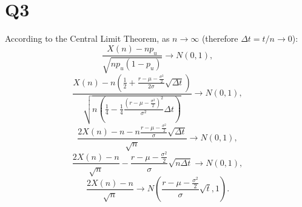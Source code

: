 \documentclass[final,3p,times]{elsarticle}
\begin{document}
\section{Q3}
	According to the Central Limit Theorem, as $n \to \infty$ (therefore $\Delta t= t/n \to 0$):
	\begin{equation}
		\frac{X(n)-n p_u}{\sqrt{n p_u \left(1- p_u\right)}} \to N\left(0,1\right)
		,
	\end{equation}
	\begin{equation*}
		\frac{X(n)-n \left(\frac{1}{2} + \frac{r-\mu-\frac{\sigma^2}{2}}{2\sigma} \sqrt{\Delta t}\right)}{\sqrt{n \left( \frac{1}{4} - \frac{1}{4}\frac{\left(r-\mu-\frac{\sigma^2}{2}\right)^2}{\sigma^2}\Delta t \right)}} \to N\left(0,1\right)
		,
	\end{equation*}
	\begin{equation*}
		\frac{2X(n)-n - n\frac{r-\mu-\frac{\sigma^2}{2}}{\sigma} \sqrt{\Delta t}}{\sqrt{n}} \to N\left(0,1\right)
		,
	\end{equation*}
	\begin{equation*}
		\frac{2X(n)-n }{\sqrt{n}}- \frac{r-\mu-\frac{\sigma^2}{2}}{\sigma} \sqrt{n\Delta t} \to N\left(0,1\right)
		,
	\end{equation*}
	\begin{equation}
		\label{EqnQ3Normal}
		\frac{2X(n)-n }{\sqrt{n}} \to N\left(\frac{r-\mu-\frac{\sigma^2}{2}}{\sigma} \sqrt{t},1\right)
		.
	\end{equation}
	
\end{document}
